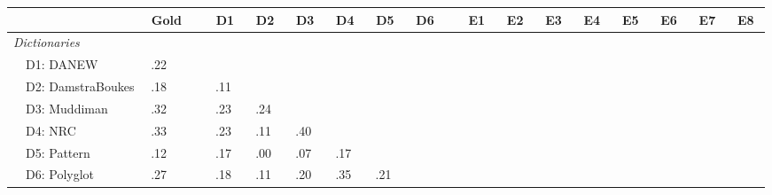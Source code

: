 \newcommand{\squeeze}[1]{$\!\!\!\!\!\!\!$#1$\!\!\!\!\!\!$}
\newcommand{\sectbreak}[1]{$\!\!\!\!\!\!\!\!\!$}
\begin{tabularx}{\textwidth}{lXlclllllllllllllll}
\toprule

& $\!\!\!\!\!$& \squeeze{ Gold }
& $\!\!\!\!\!$& \squeeze{ D1 }& \squeeze{ D2 }& \squeeze{ D3 }& \squeeze{ D4 }& \squeeze{ D5 }& \squeeze{ D6 }
& $\!\!\!\!\!$& \squeeze{ E1 }& \squeeze{ E2 }& \squeeze{ E3 }& \squeeze{ E4 }& \squeeze{ E5 }& \squeeze{ E6 }& \squeeze{ E7 }& \squeeze{ E8 }
\\
\midrule




 
\multicolumn{10}{l}{\emph{ Dictionaries }} \\
& D1: DANEW&\cellcolor[gray]{0.88}
 \squeeze{ .22 } &\sectbreak\ &&&&&& &\sectbreak\ &&&&&&&&\\
& D2: DamstraBoukes&\cellcolor[gray]{0.90}
 \squeeze{ .18 } &\sectbreak\ &\cellcolor[gray]{0.94}
 \squeeze{ .11 }&&&&& &\sectbreak\ &&&&&&&&\\
& D3: Muddiman&\cellcolor[gray]{0.83}
 \squeeze{ .32 } &\sectbreak\ &\cellcolor[gray]{0.88}
 \squeeze{ .23 }&\cellcolor[gray]{0.87}
 \squeeze{ .24 }&&&& &\sectbreak\ &&&&&&&&\\
& D4: NRC&\cellcolor[gray]{0.83}
 \squeeze{ .33 } &\sectbreak\ &\cellcolor[gray]{0.88}
 \squeeze{ .23 }&\cellcolor[gray]{0.94}
 \squeeze{ .11 }&\cellcolor[gray]{0.79}
 \squeeze{ .40 }&&& &\sectbreak\ &&&&&&&&\\
& D5: Pattern&\cellcolor[gray]{0.93}
 \squeeze{ .12 } &\sectbreak\ &\cellcolor[gray]{0.90}
 \squeeze{ .17 }&\cellcolor[gray]{1.00}
 \squeeze{ .00 }&\cellcolor[gray]{0.96}
 \squeeze{ .07 }&\cellcolor[gray]{0.91}
 \squeeze{ .17 }&& &\sectbreak\ &&&&&&&&\\
& D6: Polyglot&\cellcolor[gray]{0.86}
 \squeeze{ .27 } &\sectbreak\ &\cellcolor[gray]{0.90}
 \squeeze{ .18 }&\cellcolor[gray]{0.93}
 \squeeze{ .11 }&\cellcolor[gray]{0.89}
 \squeeze{ .20 }&\cellcolor[gray]{0.82}
 \squeeze{ .35 }&\cellcolor[gray]{0.88}
 \squeeze{ .21 }& &\sectbreak\ &&&&&&&&\\





\end{tabularx}

